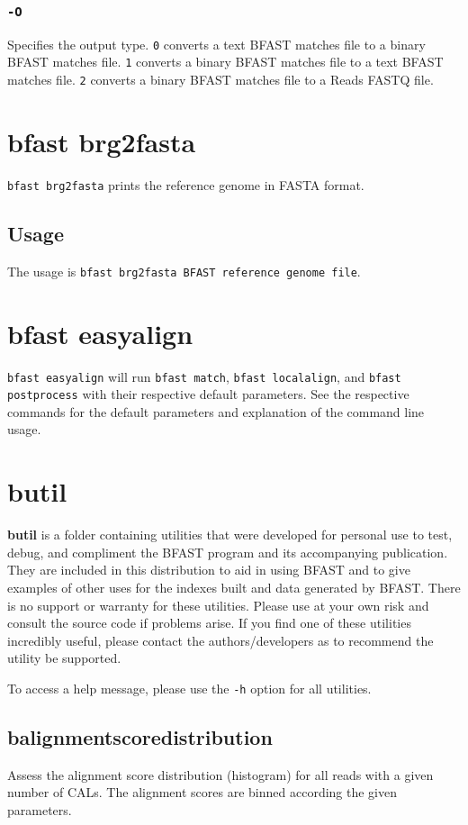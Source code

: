 \documentclass[a4paper,12pt]{book}
\newcommand{\TT}[1]{{\tt #1}} %
\newcommand{\BF}[1]{{\bf #1}} %
\newcommand{\RFF}{Reads FASTQ file}
\newcommand{\BRGF}{BFAST reference genome file} %
\newcommand{\BMF}{BFAST matches file} %
\begin{document}
\subsubsection{\TT{-O}}
Specifies the output type.
\TT{0} converts a text \BMF{} to a binary \BMF{}.
\TT{1} converts a binary \BMF{} to a text \BMF{}.
\TT{2} converts a binary \BMF{} to a \RFF{}.

\section{bfast brg2fasta}
\label{sec:brg2fasta}
\TT{bfast brg2fasta} prints the reference genome in FASTA format.
\subsection{Usage}
The usage is \TT{bfast brg2fasta \BRGF{}}.
\section{bfast easyalign}
\label{sec:easyalign}
\TT{bfast easyalign} will run \TT{bfast match}, \TT{bfast localalign}, and \TT{bfast postprocess} with their respective default parameters. 
See the respective commands for the default parameters and explanation of the command line usage.
\section{butil}
\label{sec:butil}
\BF{butil} is a folder containing utilities that were developed for personal use to test, debug, and compliment the BFAST program and its accompanying publication.  
They are included in this distribution to aid in using BFAST and to give examples of other uses for the indexes built and data generated by BFAST.
There is no support or warranty for these utilities.  
Please use at your own risk and consult the source code if problems arise.  
If you find one of these utilities incredibly useful, please contact the authors/developers as to recommend the utility be supported.

To access a help message, please use the \TT{-h} option for all utilities.

\subsection{balignmentscoredistribution}
\label{sec:balignmentscoredistribution}
Assess the alignment score distribution (histogram) for all reads with a given number of CALs.
The alignment scores are binned according the given parameters.
\end{document}
